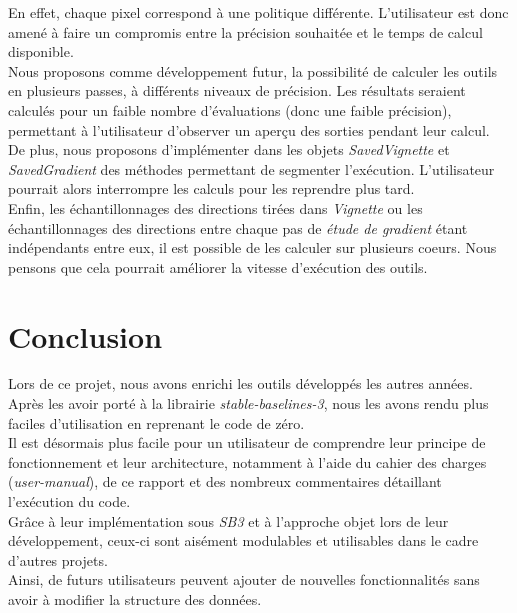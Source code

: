 \documentclass[12pt]{article}
\begin{document}
En effet, chaque pixel correspond à une politique différente. L'utilisateur est donc amené à faire un compromis entre la précision souhaitée et le temps de calcul disponible. \\

Nous proposons comme développement futur, la possibilité de calculer les outils en plusieurs passes, à différents niveaux de précision. Les résultats seraient calculés pour un faible nombre d'évaluations (donc une faible précision), permettant à l'utilisateur d'observer un aperçu des sorties pendant leur calcul. \\

De plus, nous proposons d'implémenter dans les objets \emph{SavedVignette} et \emph{SavedGradient} des méthodes permettant de segmenter l'exécution. L'utilisateur pourrait alors interrompre les calculs pour les reprendre plus tard. \\

Enfin, les échantillonnages des directions tirées dans \emph{Vignette} ou les échantillonnages des directions entre chaque pas de \emph{étude de gradient} étant indépendants entre eux, il est possible de les calculer sur plusieurs coeurs. Nous pensons que cela pourrait améliorer la vitesse d'exécution des outils. \\

\newpage
\section*{Conclusion}

Lors de ce projet, nous avons enrichi les outils développés les autres années. Après les avoir porté à la librairie \emph{stable-baselines-3}, nous les avons rendu plus faciles d'utilisation en reprenant le code de zéro. \\

Il est désormais plus facile pour un utilisateur de comprendre leur principe de fonctionnement et leur architecture, notamment à l'aide du cahier des charges (\emph{user-manual}), de ce rapport et des nombreux commentaires détaillant l'exécution du code. \\

Grâce à leur implémentation sous \emph{SB3} et à l'approche objet lors de leur développement, ceux-ci sont aisément modulables et utilisables dans le cadre d'autres projets. \\

Ainsi, de futurs utilisateurs peuvent ajouter de nouvelles fonctionnalités sans avoir à modifier la structure des données. \\
\end{document}
